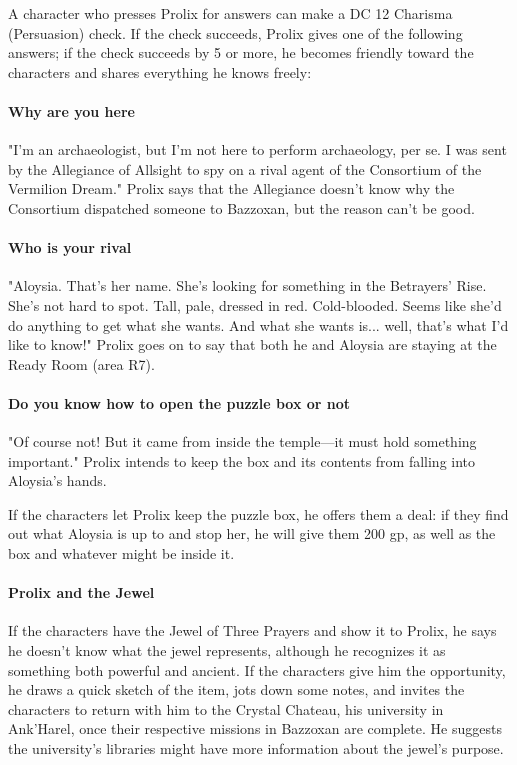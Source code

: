 \documentclass[10pt,a4paper,twoside,bg=print,twocolumn,openany,nodeprecatedcode]{dndbook}
\begin{document}
A character who presses Prolix for answers can make a DC 12 Charisma (Persuasion) check. If the check succeeds, Prolix gives one of the following answers; if the check succeeds by 5 or more, he becomes friendly toward the characters and shares everything he knows freely:

\paragraph{Why are you here}
"I'm an archaeologist, but I'm not here to perform archaeology, per se. I was sent by the Allegiance of Allsight to spy on a rival agent of the Consortium of the Vermilion Dream." Prolix says that the Allegiance doesn't know why the Consortium dispatched someone to Bazzoxan, but the reason can't be good.

\paragraph{Who is your rival}
"Aloysia. That's her name. She's looking for something in the Betrayers' Rise. She's not hard to spot. Tall, pale, dressed in red. Cold-blooded. Seems like she'd do anything to get what she wants. And what she wants is... well, that's what I'd like to know!" Prolix goes on to say that both he and Aloysia are staying at the Ready Room (area R7).

\paragraph{Do you know how to open the puzzle box or not}
"Of course not! But it came from inside the temple—it must hold something important." Prolix intends to keep the box and its contents from falling into Aloysia's hands.

If the characters let Prolix keep the puzzle box, he offers them a deal: if they find out what Aloysia is up to and stop her, he will give them 200 gp, as well as the box and whatever might be inside it.

\paragraph{Prolix and the Jewel}
If the characters have the Jewel of Three Prayers and show it to Prolix, he says he doesn't know what the jewel represents, although he recognizes it as something both powerful and ancient. If the characters give him the opportunity, he draws a quick sketch of the item, jots down some notes, and invites the characters to return with him to the Crystal Chateau, his university in Ank'Harel, once their respective missions in Bazzoxan are complete. He suggests the university's libraries might have more information about the jewel's purpose.
\end{document}
